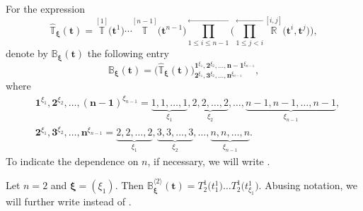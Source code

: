 \documentclass[pdftex]{sigma}
\numberwithin{equation}{section}
\newcommand\ltwo{\langle 2\rangle}
\begin{document}
For the expression
\begin{equation}\label{betthe 1}
\widehat{\mathbb{T}}_{\boldsymbol{\xi}}(\boldsymbol{t})= \overset{[1]}{\mathbb{T}}\bigl(\boldsymbol{t}^1\bigr)\cdots \overset{[n-1]}{\mathbb{T}}\bigl(\boldsymbol{t}^{n-1}\bigr)\overset{\leftarrow}{\prod\limits_{1\leq i\leq n-1}}\Biggl(\overset{\leftarrow}{\prod\limits_{1\leq j< i}}\overset{[i,j]}{\mathbb{R}}\bigl(\boldsymbol{t}^i,\boldsymbol{t}^j\bigr)\Biggr),
\end{equation}
denote by ${\mathbb{B}}_{\boldsymbol{\xi}}(\boldsymbol{t})$ the following entry
\begin{equation*}
{\mathbb{B}}_{\boldsymbol{\xi}}(\boldsymbol{t})=\bigl( \widehat{\mathbb{T}}_{\boldsymbol{\xi}}(\boldsymbol{t}) \bigr)^{\boldsymbol{1}^{\xi_1}, \boldsymbol{2}^{\xi_2}, \dots, \boldsymbol{n-1}^{\xi_{n-1}}}_{\boldsymbol{2}^{\xi_1}, \boldsymbol{3}^{\xi_2}, \dots, \boldsymbol{n}^{\xi_{n-1}}},
\end{equation*}
where
\begin{align*}
&\boldsymbol{1}^{\xi_1}, \boldsymbol{2}^{\xi_2}, \dots, \boldsymbol{(n-1)}^{\xi_{n-1}} =\underbrace{ 1, 1,\dots, 1}_{\xi_1}, \underbrace{ 2,2,\dots,2}_{\xi_2}, \dots,\underbrace{n-1, n-1, \dots, n-1}_{\xi_{n-1}},\\
&\boldsymbol{2}^{\xi_1}, \boldsymbol{3}^{\xi_2}, \dots, \boldsymbol{n}^{\xi_{n-1}} =\underbrace{ 2, 2,\dots, 2}_{\xi_1}, \underbrace{ 3,3,\dots,3}_{\xi_2}, \dots, \underbrace{n, n, \dots, n}_{\xi_{n-1}}.
\end{align*}
To indicate the dependence on $n$, if necessary, we will write .
\begin{Example}
Let $n=2$ and $\boldsymbol{\xi}=(\xi_{1}) $. Then ${\mathbb{B}}_{\boldsymbol{\xi}}^{\ltwo}(\boldsymbol{t})=T^1_{2} \bigl(t_{1}^{1} \bigr) \dots T^1_{2} \bigl(t_{\xi_1^{}}^{1}\bigr)$.
Abusing notation, we will further write \smash{${\mathbb{B}}_{\xi_1}^{\ltwo}(\boldsymbol{t})$}
instead of \smash{${\mathbb{B}}_{\boldsymbol{\xi}}^{\ltwo}(\boldsymbol{t})$}.
\end{Example}
\end{document}
